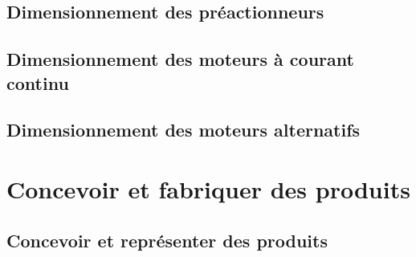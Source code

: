 \section{Dimensionnement des préactionneurs} 
\clearpage 
\newpage 
\section{Dimensionnement des moteurs à courant continu} 
\graphicspath{{\repStyle/png/}{../ELEC/ELEC-04-MCC/1023_MCC/images/}} 
 
 
\clearpage 
\newpage 
\section{Dimensionnement des moteurs alternatifs} 
\graphicspath{{\repStyle/png/}{../ELEC/ELEC-05-MA/50_BancBalafre/images/}} 
 
 
\clearpage 
\newpage 
\setchapterpreamble[u]{\margintoc} 
\chapter{Concevoir et fabriquer des produits} 
\section{Concevoir et représenter des produits} 
\graphicspath{{\repStyle/png/}{../PPM/PPM-01/1000_Dessin2D/images/}} 
 
 
\graphicspath{{\repStyle/png/}{../PPM/PPM-01/1001_Dessin2D/images/}} 
 
 
\graphicspath{{\repStyle/png/}{../PPM/PPM-01/1002_Dessin2D/images/}} 
 
 
\graphicspath{{\repStyle/png/}{../PPM/PPM-01/1003_Dessin2D/images/}} 
 
 
\graphicspath{{\repStyle/png/}{../PPM/PPM-01/1004_Dessin2D/images/}} 
 
 
\graphicspath{{\repStyle/png/}{../PPM/PPM-01/1005_Dessin2D/images/}} 
 
 
\graphicspath{{\repStyle/png/}{../PPM/PPM-01/1006_Dessin2D/images/}} 
 
 
